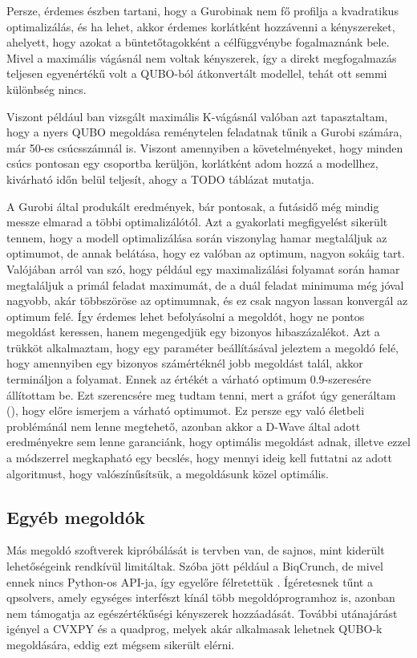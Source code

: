 Persze, érdemes észben tartani, hogy a Gurobinak nem fő profilja a kvadratikus optimalizálás, és ha lehet, akkor érdemes korlátként hozzávenni a kényszereket, ahelyett, hogy azokat a büntetőtagokként a célfüggvénybe fogalmaznánk bele. Mivel a maximális vágásnál nem voltak kényszerek, így a direkt megfogalmazás teljesen egyenértékű volt a QUBO-ból átkonvertált modellel, tehát ott semmi különbség nincs.

Viszont például ban vizsgált maximális K-vágásnál valóban azt tapasztaltam, hogy a nyers QUBO megoldása reménytelen feladatnak tűnik a Gurobi számára, már 50-es csúcsszámnál is. Viszont amennyiben a követelményeket, hogy minden csúcs pontosan egy csoportba kerüljön, korlátként adom hozzá a modellhez, kivárható időn belül teljesít, ahogy a TODO táblázat mutatja.

A Gurobi által produkált eredmények, bár pontosak, a futásidő még mindig messze elmarad a többi optimalizálótól. Azt a gyakorlati megfigyelést sikerült tennem, hogy a modell optimalizálása során viszonylag hamar megtaláljuk az optimumot, de annak belátása, hogy ez valóban az optimum, nagyon sokáig tart. 
Valójában arról van szó, hogy például egy maximalizálási folyamat során hamar megtaláljuk a primál feladat maximumát, de a duál feladat minimuma még jóval nagyobb, akár többszöröse az optimumnak, és ez csak nagyon lassan konvergál az optimum felé. Így érdemes lehet befolyásolni a megoldót, hogy ne pontos megoldást keressen, hanem megengedjük egy bizonyos hibaszázalékot. Azt a trükköt alkalmaztam, hogy egy paraméter beállításával jeleztem a megoldó felé, hogy amennyiben egy bizonyos számértéknél jobb megoldást talál, akkor termináljon a folyamat\cite{gurobiBestObjStop}. Ennek az értékét a várható optimum 0.9-szeresére állítottam be. Ezt szerencsére meg tudtam tenni, mert a gráfot úgy generáltam (), hogy előre ismerjem a várható optimumot. Ez persze egy való életbeli problémánál nem lenne megtehető, azonban akkor a D-Wave által adott eredményekre sem lenne garanciánk, hogy optimális megoldást adnak, illetve ezzel a módszerrel megkapható egy becslés, hogy mennyi ideig kell futtatni az adott algoritmust, hogy valószínűsítsük, a megoldásunk közel optimális.

\subsection{Egyéb megoldók}\label{sec:practiceOthers}

Más megoldó szoftverek kipróbálását is tervben van, de sajnos, mint kiderült lehetőségeink rendkívül limitáltak. Szóba jött például a BiqCrunch, de mivel ennek nincs Python-os API-ja, így egyelőre félretettük \cite{biqcrunch}. Ígéretesnek tűnt a qpsolvers\cite{qpsolvers}, amely egységes interfészt kínál több megoldóprogramhoz is, azonban nem támogatja az egészértékűségi kényszerek hozzáadását. További utánajárást igényel a CVXPY\cite{cvxpy} és a quadprog\cite{quadprog}, melyek akár alkalmasak lehetnek QUBO-k megoldására, eddig ezt mégsem sikerült elérni.

